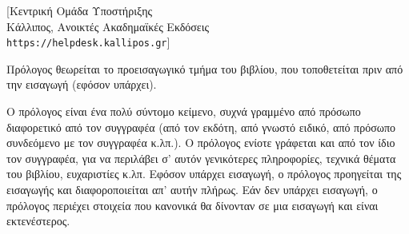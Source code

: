 [Κεντρική Ομάδα Υποστήριξης\\ Κάλλιπος, Ανοικτές Ακαδημαϊκές Εκδόσεις\\ \texttt{https://helpdesk.kallipos.gr}]



Πρόλογος  θεωρείται το προεισαγωγικό τμήμα του βιβλίου, που τοποθετείται πριν από την εισαγωγή (εφόσον υπάρχει).

Ο πρόλογος είναι ένα πολύ σύντομο κείμενο, συχνά γραμμένο από πρόσωπο διαφορετικό από τον συγγραφέα (από τον εκδότη, από γνωστό ειδικό, από πρόσωπο συνδεόμενο με τον συγγραφέα κ.λπ.). Ο πρόλογος ενίοτε γράφεται και από τον ίδιο τον συγγραφέα, για να περιλάβει σ’ αυτόν γενικότερες πληροφορίες, τεχνικά θέματα του βιβλίου, ευχαριστίες κ.λπ. Εφόσον υπάρχει εισαγωγή, ο πρόλογος προηγείται της εισαγωγής και διαφοροποιείται απ’ αυτήν πλήρως. Εάν δεν υπάρχει εισαγωγή, ο πρόλογος περιέχει στοιχεία που κανονικά θα δίνονταν σε μια εισαγωγή και είναι εκτενέστερος.
